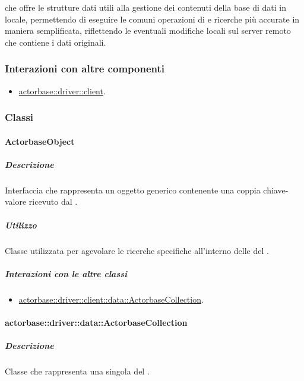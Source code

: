 \documentclass{scalatekids-article}
\begin{document}
 che offre le strutture dati utili alla gestione dei contenuti
della base di dati in locale, permettendo di eseguire le comuni operazioni di
 e ricerche più accurate in maniera semplificata, riflettendo le
eventuali modifiche locali sul server remoto che contiene i dati originali.

\subsubsection{Interazioni con altre componenti}
\begin{itemize}
\item \hyperref[sec:actorbase::driver::client]{actorbase::driver::client}.
\end{itemize}

\subsubsection{Classi}

\paragraph{ActorbaseObject}
\label{sec:actorbase::driver::data::ActorbaseObject}

\subparagraph{Descrizione}

Interfaccia che rappresenta un oggetto generico contenente una coppia
chiave-valore ricevuto dal .

\subparagraph{Utilizzo}

Classe utilizzata per agevolare le ricerche specifiche all'interno delle
 del .

\subparagraph{Interazioni con le altre classi}

\begin{itemize}
\item \hyperref[sec:actorbase::driver::client::data::ActorbaseCollection]{actorbase::driver::client::data::ActorbaseCollection}.
\end{itemize}

\paragraph{actorbase::driver::data::ActorbaseCollection}
\label{sec:actorbase::driver::data::ActorbaseCollection}

\subparagraph{Descrizione}

Classe che rappresenta una singola  del .
\end{document}
